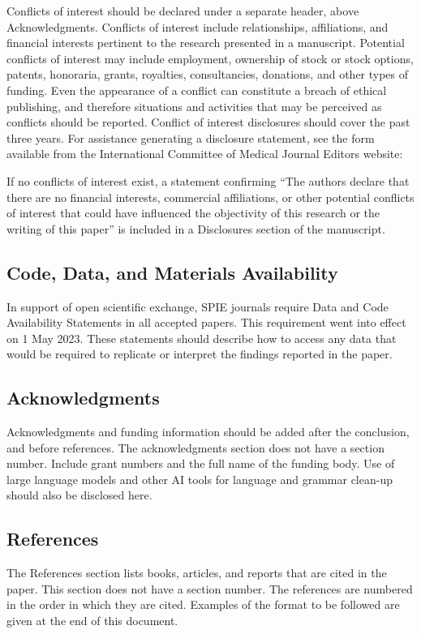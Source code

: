 \documentclass[12pt]{spieman}  %
\begin{document}
\begin{spacing}{2}
Conflicts of interest should be declared under a separate header, above Acknowledgments. Conflicts of interest include relationships, affiliations, and financial interests pertinent to the research presented in a manuscript. Potential conflicts of interest may include employment, ownership of stock or stock options, patents, honoraria, grants, royalties, consultancies, donations, and other types of funding. Even the appearance of a conflict can constitute a breach of ethical publishing, and therefore situations and activities that may be perceived as conflicts should be reported. Conflict of interest disclosures should cover the past three years. For assistance generating a disclosure statement, see the form available from  the International Committee of Medical Journal Editors website: 

If no conflicts of interest exist, a statement confirming “The authors declare that there are no financial interests, commercial affiliations, or other potential conflicts of interest that could have influenced the objectivity of this research or the writing of this paper” is included in a Disclosures section of the manuscript. 

\subsection{Code, Data, and Materials Availability}
In support of open scientific exchange, SPIE journals require Data and Code Availability Statements in all accepted papers. This requirement went into effect on 1 May 2023. These statements should describe how to access any data that would be required to replicate or interpret the findings reported in the paper.  

\subsection{Acknowledgments}
 Acknowledgments and funding information should be added after the conclusion, and before references. The acknowledgments section does not have a section number. Include grant numbers and the full name of the funding body. Use of large language models and other AI tools for language and grammar clean-up should also be disclosed here.

\subsection{References}
The References section lists books, articles, and reports that are cited in the paper. This section does not have a section number. The references are numbered in the order in which they are cited. Examples of the format to be followed are given at the end of this document.


\end{spacing}
\end{document}
